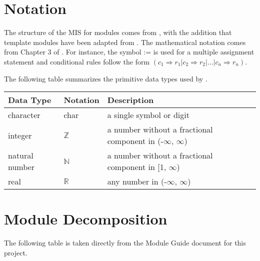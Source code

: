 \documentclass[12pt, titlepage]{article}
\begin{document}
\section{Notation}


The structure of the MIS for modules comes from \citet{HoffmanAndStrooper1995},
with the addition that template modules have been adapted from
\cite{GhezziEtAl2003}.  The mathematical notation comes from Chapter 3 of
\citet{HoffmanAndStrooper1995}.  For instance, the symbol := is used for a
multiple assignment statement and conditional rules follow the form $(c_1
\Rightarrow r_1 | c_2 \Rightarrow r_2 | ... | c_n \Rightarrow r_n )$.

The following table summarizes the primitive data types used by \progname. 

\begin{center}
\renewcommand{\arraystretch}{1.2}
\noindent 
\begin{tabular}{l l p{7.5cm}} 
\toprule 
\textbf{Data Type} & \textbf{Notation} & \textbf{Description}\\ 
\midrule
character & char & a single symbol or digit\\
integer & $\mathbb{Z}$ & a number without a fractional component in (-$\infty$, $\infty$) \\
natural number & $\mathbb{N}$ & a number without a fractional component in [1, $\infty$) \\
real & $\mathbb{R}$ & any number in (-$\infty$, $\infty$)\\
\bottomrule
\end{tabular} 
\end{center}

\noindent

\section{Module Decomposition}

The following table is taken directly from the Module Guide document for this project.
\end{document}
